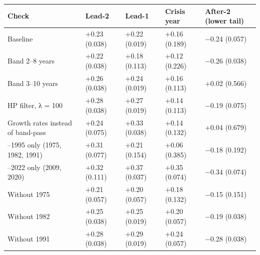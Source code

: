 \documentclass[11pt,a4paper]{article}
\newcounter{none}                    %
\begin{document}
{\def\LTcaptype{none} %
\begin{longtable}[]{@{}
  >{\raggedright\arraybackslash}p{}
  >{\raggedright\arraybackslash}p{}
  >{\raggedright\arraybackslash}p{}
  >{\raggedright\arraybackslash}p{}
  >{\raggedright\arraybackslash}p{}@{}}
\toprule\noalign{}
\begin{minipage}[b]{\linewidth}\raggedright
Check
\end{minipage} & \begin{minipage}[b]{\linewidth}\raggedright
Lead-2
\end{minipage} & \begin{minipage}[b]{\linewidth}\raggedright
Lead-1
\end{minipage} & \begin{minipage}[b]{\linewidth}\raggedright
Crisis year
\end{minipage} & \begin{minipage}[b]{\linewidth}\raggedright
After-2 (lower tail)
\end{minipage} \\
\midrule\noalign{}
\endhead
\bottomrule\noalign{}
\endlastfoot
Baseline & +0.23 (0.038) & +0.22 (0.019) & +0.16 (0.189) & −0.24 (0.057) \\
Band 2–8 years & +0.22 (0.038) & +0.18 (0.113) & +0.12 (0.226) & −0.26 (0.038) \\
Band 3–10 years & +0.26 (0.038) & +0.24 (0.019) & +0.16 (0.113) & +0.02 (0.566) \\
HP filter, λ = 100 & +0.28 (0.038) & +0.27 (0.019) & +0.14 (0.113) & −0.19 (0.075) \\
Growth rates instead of band-pass & +0.24 (0.075) & +0.33 (0.038) & +0.14 (0.132) & +0.04 (0.679) \\
1970–1995 only (1975, 1982, 1991) & +0.31 (0.077) & +0.21 (0.154) & +0.06 (0.385) & −0.18 (0.192) \\
1996–2022 only (2009, 2020) & +0.32 (0.111) & +0.37 (0.037) & +0.35 (0.074) & −0.34 (0.074) \\
Without 1975 & +0.21 (0.057) & +0.20 (0.057) & +0.18 (0.132) & −0.15 (0.151) \\
Without 1982 & +0.25 (0.038) & +0.25 (0.019) & +0.20 (0.057) & −0.19 (0.038) \\
Without 1991 & +0.28 (0.038) & +0.29 (0.019) & +0.24 (0.057) & −0.28 (0.038) \\

\end{longtable}}
\end{document}

